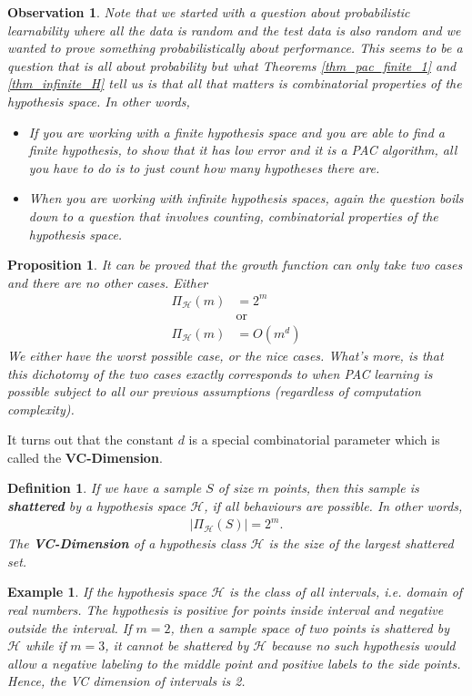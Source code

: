 \documentclass[10pt ]{article}
\newtheorem{example}{Example}
\newtheorem{obs}{Observation}
\newtheorem{mydef}{Definition}
\newtheorem{prop}{Proposition}
\begin{document}
\begin{obs}{\em 
Note that we started with a question about probabilistic learnability where all the data is random and the test data is also random and we wanted to prove something probabilistically about performance. This seems to be a question that is all about probability but what Theorems \ref{thm_pac_finite_1} and \ref{thm_infinite_H} tell us is that all that matters is combinatorial properties of the hypothesis space. In other words,
\begin{itemize}
\item If you are working with a finite hypothesis space and you are able to find a finite hypothesis, to show that it has low error and it is a PAC algorithm, all you have to do is to just count how many hypotheses there are.
\item When you are working with infinite hypothesis spaces, again the question boils down to a question that involves counting, combinatorial properties of the hypothesis space. 
\end{itemize}
}
\end{obs}
\begin{prop}{\em
It can be proved that the growth function can only take two cases and there are no other cases. Either 
\begin{align}
\Pi_{\mathcal{H}}(m) & = 2^m  \\
&\mathrm{or} \nonumber \\
\Pi_{\mathcal{H}}(m) & = O(m^d)
\end{align}
We either have the worst possible case, or the nice cases. What's more, is that this dichotomy of the two cases exactly corresponds to when PAC learning is possible subject to all our previous assumptions (regardless of computation complexity). 
}\label{prop_dichotomy_growth}
\end{prop}

It turns out that the constant $d$ is a special combinatorial parameter which is called the \textbf{VC-Dimension}.

\begin{mydef}
{\em 
If we have a sample $S$ of size $m$ points, then this sample is \textbf{shattered} by a hypothesis space $\mathcal{H}$, if all behaviours are possible. In other words, 
\begin{align}
|\Pi_{\mathcal{H}}(S)| =  2^m.
\end{align}
The \textbf{VC-Dimension} of a hypothesis class $\mathcal{H}$ is the size of the largest shattered set. 
}
\end{mydef}
\begin{example}
{\em 
If the hypothesis space $\mathcal{H}$ is the class of all intervals, i.e. domain of real numbers. The hypothesis is positive for points inside interval and negative outside the interval. If $m=2$, then a sample space of two points is shattered by $\mathcal{H}$ while if $m=3$, it cannot be shattered by $\mathcal{H}$ because no such hypothesis would allow a negative labeling to the middle point and positive labels to the side points. Hence, the VC dimension of intervals is 2. 
}
\end{example}
\end{document}
